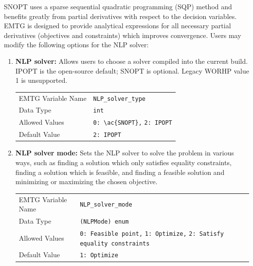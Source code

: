 \noindent \ac{SNOPT} uses a sparse sequential quadratic programming (SQP) method and benefits greatly from partial derivatives with respect to the decision variables. \ac{EMTG} is designed to provide analytical expressions for all necessary partial derivatives (objectives and constraints) which improves convergence. Users may modify the following options for the \ac{NLP} solver: \\


\begin{enumerate}

    \item \textbf{\ac{NLP} solver:} Allows users to choose a solver compiled into the current build. IPOPT is the open-source default; SNOPT is optional. Legacy WORHP value 1 is unsupported.
        \begin{table}[H]
            \hspace{2cm}
            \begin{tabular}{lp{5cm}}
            \ac{EMTG} Variable Name & \verb|NLP_solver_type| \\
            Data Type & \verb|int| \\
            Allowed Values & \verb|0: \ac{SNOPT},| \newline
                            \verb|2: IPOPT|  \\
            Default Value & \verb|2: IPOPT| \\
            \end{tabular}
        \end{table}

    \item \textbf{\ac{NLP} solver mode:} Sets the \ac{NLP} solver to solve the problem in various ways, such as finding a solution which only satisfies equality constraints, finding a solution which is feasible, and finding a feasible solution and minimizing or maximizing the chosen objective.
        \begin{table}[H]
            \hspace{2cm}
            \begin{tabular}{lp{5cm}}
            \ac{EMTG} Variable Name & \verb|NLP_solver_mode| \\
            Data Type & \verb|(NLPMode) enum| \\
            Allowed Values & \verb|0: Feasible point,| \newline
                            \verb|1: Optimize,| \newline
                            \verb|2: Satisfy equality constraints| \\
            Default Value & \verb|1: Optimize| \\
            \end{tabular}
        \end{table}
    

\end{enumerate}
